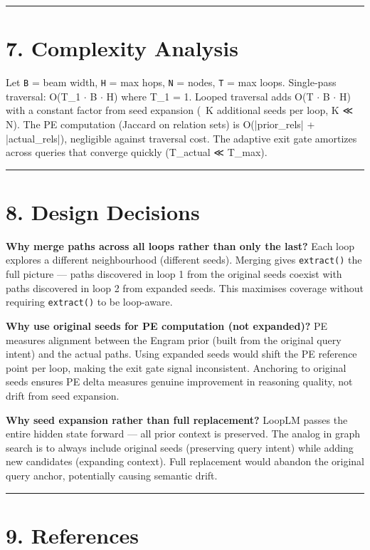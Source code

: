 \medskip\noindent\rule{\linewidth}{0.4pt}\medskip

\section*{7. Complexity Analysis}

Let \texttt{B} = beam width, \texttt{H} = max hops, \texttt{N} = nodes, \texttt{T} = max loops. Single-pass traversal: O(T_1 $\cdot$ B $\cdot$ H) where T_1 = 1. Looped traversal adds O(T $\cdot$ B $\cdot$ H) with a constant factor from seed expansion (~K additional seeds per loop, K ≪ N). The PE computation (Jaccard on relation sets) is O(|prior_rels| + |actual_rels|), negligible against traversal cost. The adaptive exit gate amortizes across queries that converge quickly (T_actual ≪ T_max).

\medskip\noindent\rule{\linewidth}{0.4pt}\medskip

\section*{8. Design Decisions}

\textbf{Why merge paths across all loops rather than only the last?}
Each loop explores a different neighbourhood (different seeds). Merging gives \texttt{extract()} the full picture --- paths discovered in loop 1 from the original seeds coexist with paths discovered in loop 2 from expanded seeds. This maximises coverage without requiring \texttt{extract()} to be loop-aware.

\textbf{Why use original seeds for PE computation (not expanded)?}
PE measures alignment between the Engram prior (built from the original query intent) and the actual paths. Using expanded seeds would shift the PE reference point per loop, making the exit gate signal inconsistent. Anchoring to original seeds ensures PE delta measures genuine improvement in reasoning quality, not drift from seed expansion.

\textbf{Why seed expansion rather than full replacement?}
LoopLM passes the entire hidden state forward --- all prior context is preserved. The analog in graph search is to always include original seeds (preserving query intent) while adding new candidates (expanding context). Full replacement would abandon the original query anchor, potentially causing semantic drift.

\medskip\noindent\rule{\linewidth}{0.4pt}\medskip

\section*{9. References}

